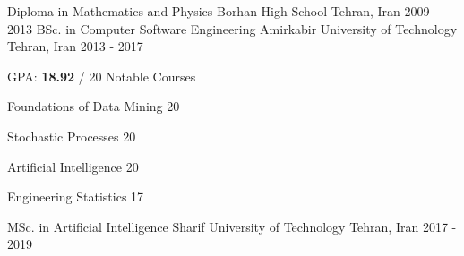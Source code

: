 \begin{cventries}
  \cventry
    {Diploma in Mathematics and Physics} %
    {Borhan High School} %
    {Tehran, Iran} %
    {2009 - 2013} %
    {}
  \cventry
    {BSc. in Computer Software Engineering} %
    {Amirkabir University of Technology} %
    {Tehran, Iran} %
    {2013 - 2017} %
    {
    GPA: \textbf{18.92} / 20
    \newline
    \textcolor{awesome}{Notable Courses}
    \vspace{-.4cm}
    \begin{multicols}{3}
    \begin{cvitems}
    \item {Foundations of Data Mining \hspace{0.5cm} 20}
    \item {Stochastic Processes \hspace{0.5cm} 20}
    \item {Artificial Intelligence \hspace{0.5cm} 20}
    \item {Engineering Statistics \hspace{0.5cm} 17}
    \end{cvitems}
    \end{multicols}
    }
  \cventry
    {MSc. in Artificial Intelligence} %
    {Sharif University of Technology} %
    {Tehran, Iran} %
    {2017 - 2019} %
    {}
\end{cventries}

